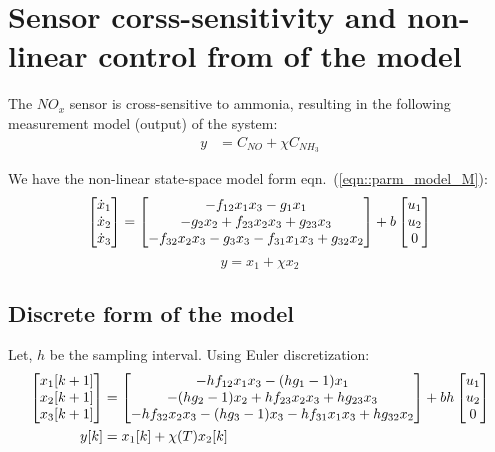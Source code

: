 \section{Sensor corss-sensitivity and non-linear control from of the model}

The $NO_x$ sensor is cross-sensitive to ammonia, resulting in the following
measurement model (output) of the system:
\begin{align*}
    y &= C_{NO} + \chi C_{NH_3}
\end{align*}

We have the non-linear state-space model form eqn.~(\ref{eqn::parm_model_M}):
\begin{equation}\label{eqn::ctrl_state}
    \begin{bmatrix} \dot x_1 \\
        \dot x_2\\
        \dot x_3\\
         \end{bmatrix} =
    \begin{bmatrix} 
        -f_{12} x_1 x_3
        -g_1 x_1
        \\
        -g_2 x_2
        + f_{23} x_2 x_3
        + g_{23} x_3
        \\
        -f_{32} x_2 x_3
        -g_3 x_3
        -f_{31} x_1 x_3
        + g_{32} x_2
     \end{bmatrix}
    + b \begin{bmatrix} u_1 \\ u_2 \\ 0 \end{bmatrix}
\end{equation}
\begin{equation}\label{eqn::ctrl_out}
    y = x_1 + \chi x_2
\end{equation}


\subsection{Discrete form of the model}
Let, $h$ be the sampling interval. Using Euler discretization:
\begin{align*}
    \begin{bmatrix} x_1[k+1] \\
        x_2[k+1] \\
        x_3[k+1] \\
         \end{bmatrix} &=
    \begin{bmatrix} 
        -hf_{12} x_1 x_3
        -(hg_1-1) x_1
        \\
        -(hg_2-1) x_2
        + hf_{23} x_2 x_3
        + hg_{23} x_3
        \\
        - hf_{32} x_2 x_3
        -(hg_3-1) x_3
        - hf_{31} x_1 x_3
        + hg_{32} x_2
     \end{bmatrix}
    + bh \begin{bmatrix} u_1 \\ u_2 \\ 0 \end{bmatrix}\\
    y[k] &= x_1[k] + \chi(T) x_2[k]
\end{align*}
